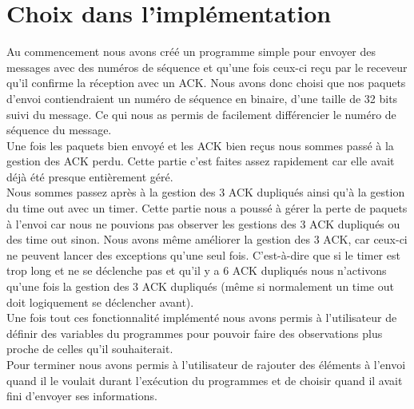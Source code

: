 \documentclass[a4paper,10pt]{article}
\begin{document}
\section{Choix dans l'implémentation}
Au commencement nous avons créé un programme simple pour envoyer des messages avec des numéros de séquence et qu'une fois ceux-ci reçu par le receveur qu'il confirme la réception avec un ACK. Nous avons donc choisi que nos paquets d'envoi contiendraient un numéro de séquence en binaire, d'une taille de 32 bits suivi du message. Ce qui nous as permis de facilement différencier le numéro de séquence du message.\\
Une fois les paquets bien envoyé et les ACK bien reçus nous sommes passé à la gestion des ACK perdu. Cette partie c'est faites assez rapidement car elle avait déjà été presque entièrement géré.\\
Nous sommes passez après à la gestion des 3 ACK dupliqués ainsi qu'à la gestion du time out avec un timer. Cette partie nous a poussé à gérer la perte de paquets à l'envoi car nous ne pouvions pas observer les gestions des 3 ACK dupliqués ou des time out sinon. Nous avons même améliorer la gestion des 3 ACK, car ceux-ci ne peuvent lancer des exceptions qu'une seul fois. C'est-à-dire que si le timer est trop long et ne se déclenche pas et qu'il y a 6 ACK dupliqués nous n'activons qu'une fois la gestion des 3 ACK dupliqués (même si normalement un time out doit logiquement se déclencher avant).\\
Une fois tout ces fonctionnalité implémenté nous avons permis à l'utilisateur de définir des variables du programmes pour pouvoir faire des observations plus proche de celles qu'il souhaiterait.\\
Pour terminer nous avons permis à l'utilisateur de rajouter des éléments à l'envoi quand il le voulait durant l'exécution du programmes et de choisir quand il avait fini d'envoyer ses informations.\\
\end{document}
